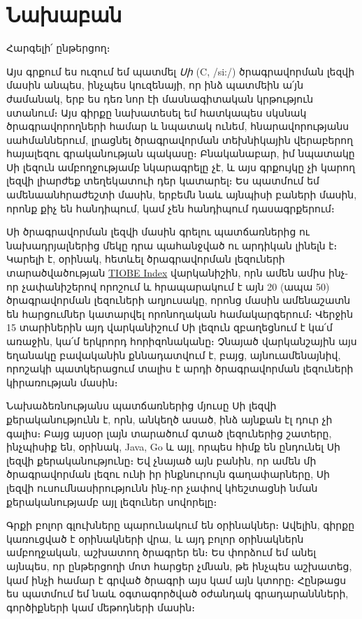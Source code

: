 \chapter*{Նախաբան}

Հարգելի՛ ընթերցող։

Այս գրքում ես ուզում եմ պատմել \emph{Սի} (C, /si:/) ծրագրավորման լեզվի մասին անպես, ինչպես կուզենայի, որ ինձ պատմեին ա՛յն ժամանակ, երբ ես դեռ նոր էի մասնագիտական կրթություն ստանում։ Այս գիրքը նախատեսել եմ հատկապես սկսնակ ծրագրավորողների համար և նպատակ ունեմ, հնարավորությանս սահմաններում, լրացնել ծրագրավորման տեխնիկային վերաբերող հայալեզու գրականության պակասը։ Բնականաբար, իմ նպատակը Սի լեզուն ամբողջությամբ նկարագրելը չէ, և այս գրքույկը չի կարող լեզվի լիարժեք տեղեկատուի դեր կատարել։ Ես պատմում եմ ամենաանհրաժեշտի մասին, երբեմն նաև այնպիսի բաների մասին, որոնք քիչ են հանդիպում, կամ չեն հանդիպում դասագրքերում։

Սի ծրագրավորման լեզվի մասին գրելու պատճառներից ու նախադրյալներից մեկը դրա պահանջված ու արդիկան լինելն է։ Կարելի է, օրինակ, հետևել ծրագրավորման լեզուների տարածվածության \href{http://www.tiobe.com/index.php/content/paperinfo/tpci/index.html}{TIOBE Index} վարկանիշին, որն ամեն ամիս ինչ-որ չափանիշերով որոշում և հրապարակում է այն 20 (ապա 50) ծրագրավորման լեզուների աղյուսակը, որոնց մասին ամենաշատն են հարցումներ կատարվել որոնողական համակարգերում։ Վերջին 15 տարիներին այդ վարկանիշում Սի լեզուն զբաղեցնում է կա՛մ առաջին, կա՛մ երկրորդ հորիզոնականը։ Չնայած վարկանշային այս եղանակը բավականին քննադատվում է, բայց, այնուամենայնիվ, որոշակի պատկերացում տալիս է արդի ծրագրավորման լեզուների կիրառության մասին։

Նախաձեռնությանս պատճառներից մյուսը Սի լեզվի քերականությունն է, որն, անկեղծ ասած, ինձ այնքան էլ դուր չի գալիս։ Բայց այսօր լայն տարածում գտած լեզուներից շատերը, ինչպիսիք են, օրինակ, Java, Go և այլ, որպես հիմք են ընդունել Սի լեզվի քերականությունը։ Եվ չնայած այն բանին, որ ամեն մի ծրագրավորման լեզու ունի իր ինքնուրույն գաղափարները, Սի լեզվի ուսումնասիրությունն ինչ-որ չափով կհեշտացնի նման քերականությամբ այլ լեզուներ սովորելը։


Գրքի բոլոր գլուխները պարունակում են օրինակներ։ Ավելին, գիրքը կառուցված է օրինակների վրա, և այդ բոլոր օրինակներն ամբողջական, աշխատող ծրագրեր են։ Ես փորձում եմ անել այնպես, որ ընթերցողի մոտ հարցեր չմնան, թե ինչպես աշխատեց, կամ ինչի համար է գրված ծրագրի այս կամ այն կտորը։ Հընթացս ես պատմում եմ նաև օգտագործված օժանդակ գրադարաննների, գործիքների կամ մեթոդների մասին։
